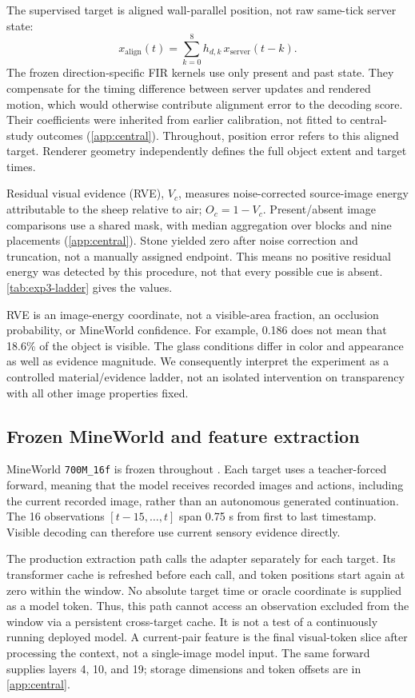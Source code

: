\documentclass{article}
\begin{document}
The supervised target is aligned wall-parallel position, not raw same-tick server state:
\[
x_{\mathrm{align}}(t)=\sum_{k=0}^{8}h_{d,k}\,x_{\mathrm{server}}(t-k).
\]
The frozen direction-specific FIR kernels use only present and past state. They compensate for the timing difference between server updates and rendered motion, which would otherwise contribute alignment error to the decoding score. Their coefficients were inherited from earlier calibration, not fitted to central-study outcomes (\autoref{app:central}). Throughout, position error refers to this aligned target. Renderer geometry independently defines the full object extent and target times.

Residual visual evidence (RVE), $V_c$, measures noise-corrected source-image energy attributable to the sheep relative to air; $O_c=1-V_c$. Present/absent image comparisons use a shared mask, with median aggregation over blocks and nine placements (\autoref{app:central}). Stone yielded zero after noise correction and truncation, not a manually assigned endpoint. This means no positive residual energy was detected by this procedure, not that every possible cue is absent. \autoref{tab:exp3-ladder} gives the values.

RVE is an image-energy coordinate, not a visible-area fraction, an occlusion probability, or MineWorld confidence. For example, 0.186 does not mean that 18.6\% of the object is visible. The glass conditions differ in color and appearance as well as evidence magnitude. We consequently interpret the experiment as a controlled material/evidence ladder, not an isolated intervention on transparency with all other image properties fixed.

\subsection{Frozen MineWorld and feature extraction}
\label{sec:features}
MineWorld \texttt{700M\_16f} is frozen throughout \citep{guo2025mineworld}. Each target uses a teacher-forced forward, meaning that the model receives recorded images and actions, including the current recorded image, rather than an autonomous generated continuation. The 16 observations $[t-15,\ldots,t]$ span 0.75 s from first to last timestamp. Visible decoding can therefore use current sensory evidence directly.

The production extraction path calls the adapter separately for each target. Its transformer cache is refreshed before each call, and token positions start again at zero within the window. No absolute target time or oracle coordinate is supplied as a model token. Thus, this path cannot access an observation excluded from the window via a persistent cross-target cache. It is not a test of a continuously running deployed model. A current-pair feature is the final visual-token slice after processing the context, not a single-image model input. The same forward supplies layers 4, 10, and 19; storage dimensions and token offsets are in \autoref{app:central}.
\end{document}
